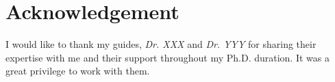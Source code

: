 \chapter*{Acknowledgement}

\noindent
I would like to thank my guides, 
\textit{Dr. XXX}  and 
\textit{Dr. YYY} 
for sharing their expertise with me and their support throughout my Ph.D. duration. 
% 
It was a great privilege to work with them. \\[1em] 
